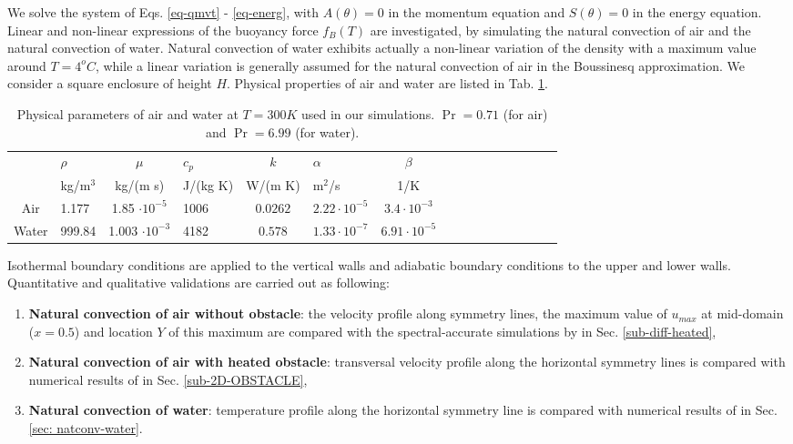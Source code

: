 We solve the system of Eqs. \ref{eq-qmvt} - \ref{eq-energ}, with $A(\theta) = 0$ in the momentum equation and $S(\theta) = 0$ in the energy equation.
Linear and non-linear expressions of the buoyancy force $f_B(T)$ are investigated, by simulating the natural convection of air and the natural convection of water.
Natural convection of water exhibits actually a non-linear variation of the density with a maximum value around $T=4^o C$, while a linear variation is generally assumed for the natural convection of air in the Boussinesq approximation.
We consider a square enclosure of height $H$. 
Physical properties of air and water are listed in Tab. \ref{tab-param-phys-air}.
\begin{table}[!h]
   \begin{center}
      \begin{tabular}{*{8}{cl}}
         
        & $\rho$ &$ \mu$ & $c_p $ & $k$ & $\alpha $ & $\beta$ \\
        & kg/m$^3$& kg/(m s) & J/(kg K) & W/(m K) & m$^2$/s & 1/K \\
         \hline
        Air & 1.177 & 1.85 $\cdot 10^{-5}$  & 1006 & $0.0262$ & $2.22 \cdot 10^{-5}$ & $3.4 \cdot 10^{-3}$ \\
        Water & 999.84 & 1.003 $\cdot 10^{-3}$  & 4182 & $0.578$ & $1.33 \cdot 10^{-7}$ & $6.91 \cdot 10^{-5}$
      \end{tabular}
   \end{center}
   \caption{Physical parameters of air and water at $T = 300K$ used in our simulations. $\Pr = 0.71$ (for air) and $\Pr = 6.99$ (for water).}
   \label{tab-param-phys-air}
\end{table}

\noindent Isothermal boundary conditions are applied to the vertical walls and adiabatic boundary conditions to the upper and lower walls.
Quantitative and qualitative validations are carried out as following:
\begin{enumerate}[label=(\roman*)]
\item \textbf{Natural convection of air without obstacle}: the velocity profile along symmetry lines, the maximum value of $u_{max}$ at mid-domain ($x=0.5$) and location $Y$ of this maximum  are compared with the spectral-accurate simulations by \cite{LeQuere91} in Sec. \ref{sub-diff-heated}, 
\item \textbf{Natural convection of air with heated obstacle}: transversal velocity profile along the  horizontal symmetry lines is compared with numerical results of \cite{Raluca2013} 
in Sec. \ref{sub-2D-OBSTACLE}, 
\item \textbf{Natural convection of water}: temperature profile along the horizontal symmetry line is compared with numerical results of \cite{Kowalewski-2003} in Sec. \ref{sec: natconv-water}.

\end{enumerate}

